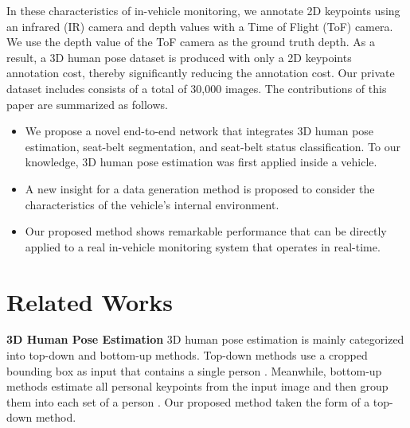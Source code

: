 \documentclass[letterpaper]{article} %
\begin{document}
In these characteristics of in-vehicle monitoring, we annotate 2D keypoints using an infrared (IR) camera and depth values with a Time of Flight (ToF) camera. We use the depth value of the ToF camera as the ground truth depth. As a result, a 3D human pose dataset is produced with only a 2D keypoints annotation cost, thereby significantly reducing the annotation cost. Our private dataset includes consists of a total of 30,000 images. The contributions of this paper are summarized as follows.

\begin{itemize}
\item We propose a novel end-to-end network that integrates 3D human pose estimation, seat-belt segmentation, and seat-belt status classification. To our knowledge, 3D human pose estimation was first applied inside a vehicle.
\item A new insight for a data generation method is proposed to consider the characteristics of the vehicle's internal environment.
\item Our proposed method shows remarkable performance that can be directly applied to a real in-vehicle monitoring system that operates in real-time.
\end{itemize}

\section{Related Works}
\textbf{3D Human Pose Estimation}
3D human pose estimation is mainly categorized into top-down and bottom-up methods. Top-down methods use a cropped bounding box as input that contains a single person \cite{li20143d, sun2017compositional, pavlakos2017coarse, sun2018integral, moon2019camera, martinez2017simple, nie2017monocular, gong2021poseaug, llopart2020liftformer}. Meanwhile, bottom-up methods estimate all personal keypoints from the input image and then group them into each set of a person \cite{fabbri2020compressed, li2020hmor, lin2020hdnet, mehta2020xnect, wang2010combined}. Our proposed method taken the form of a top-down method. 
\end{document}
